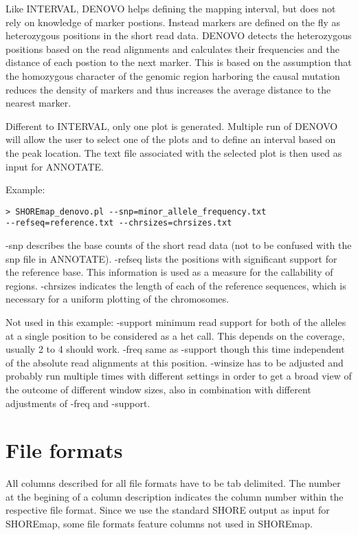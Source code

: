 \documentclass[a4paper,10pt]{scrartcl}
\begin{document}
Like INTERVAL, DENOVO helps defining the mapping interval, but does not rely on knowledge of marker postions. Instead markers are defined on the fly as heterozygous positions in the short read data. DENOVO detects the heterozygous positions based on the read alignments and calculates their frequencies and the distance of each postion to the next marker. This is based on the assumption that the homozygous character of the genomic region harboring the causal mutation reduces the density of markers and thus increases the average distance to the nearest marker.

Different to INTERVAL, only one plot is generated. Multiple run of DENOVO will allow the user to select one of the plots and to define an interval based on the peak location. The text file associated with the selected plot is then used as input for ANNOTATE. 

Example:

\begin{verbatim}
> SHOREmap_denovo.pl --snp=minor_allele_frequency.txt 
--refseq=reference.txt --chrsizes=chrsizes.txt
\end{verbatim}

-snp describes the base counts of the short read data (not to be confused with the snp file in ANNOTATE). -refseq lists the positions with significant support for the reference base. This information is used as a measure for the callability of regions. -chrsizes indicates the length of each of the reference sequences, which is necessary for a uniform plotting of the chromosomes.

Not used in this example: -support minimum read support for both of the alleles at a single position to be considered as a het call. This depends on the coverage, usually 2 to 4 should work. -freq same as -support though this time independent of the absolute read alignments at this position. -winsize has to be adjusted and probably run multiple times with different settings in order to get a broad view of the outcome of different window sizes, also in combination with different adjustments of -freq and -support.

\section{File formats}

All columns described for all file formats have to be tab delimited. The number at the begining of a column description indicates the column number within the respective file format. Since we use the standard SHORE output as input for SHOREmap, some file formats feature columns not used in SHOREmap.
\end{document}
